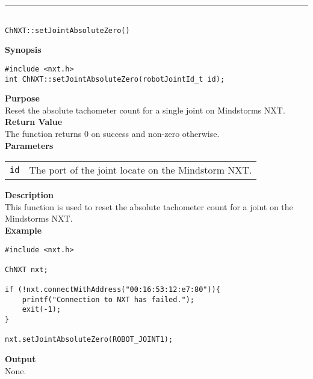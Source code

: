 \noindent
\vspace{5pt}
\rule{4.5in}{0.015in}\\
\noindent
{\LARGE \texttt{ChNXT::setJointAbsoluteZero()} }\\


\noindent
{\bf Synopsis}
\vspace{-8pt}
\begin{verbatim}
#include <nxt.h>
int ChNXT::setJointAbsoluteZero(robotJointId_t id);
\end{verbatim}

\noindent
{\bf Purpose}\\
Reset the absolute tachometer count for a single joint on Mindstorms NXT.\\

\noindent
{\bf Return Value}\\
The function returns 0 on success and non-zero otherwise.\\

\noindent
{\bf Parameters}\\
\vspace{-0.1in}
\begin{description}
\item
\begin{tabular}{p{20mm}p{135mm}}
\texttt{id} &The port of the joint locate on the Mindstorm NXT.\\
\end{tabular}
\end{description}

\noindent
{\bf Description}\\
This function is used to reset the absolute tachometer count for a joint on the Mindstorms NXT.\\

\noindent
{\bf Example}
\begin{verbatim}
#include <nxt.h> 

ChNXT nxt;

if (!nxt.connectWithAddress("00:16:53:12:e7:80")){
    printf("Connection to NXT has failed.");
    exit(-1);
}
    
nxt.setJointAbsoluteZero(ROBOT_JOINT1);
\end{verbatim}

\noindent
{\bf Output}\\
None.\\
\\
